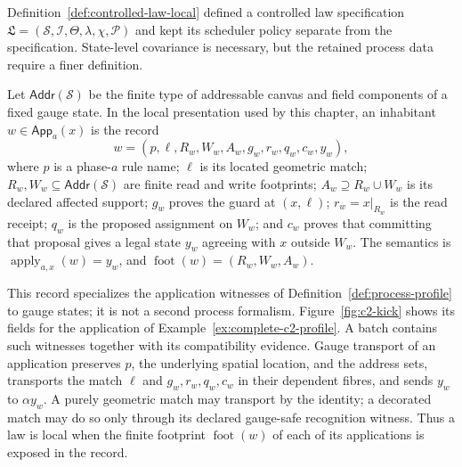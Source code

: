 Definition~\ref{def:controlled-law-local} defined a controlled law specification
$\mathfrak L=(\mathcal S,\mathcal I,\Theta,\lambda,\chi,\mathcal P)$ and kept
its scheduler policy separate from the specification.  State-level covariance
is necessary, but the retained process data require a finer definition.

\begin{definition}
\label{def:located-gauge-application}
Let $\mathsf{Addr}(\mathcal S)$ be the finite type of addressable canvas and
field components of a fixed gauge state.  In the local presentation used by
this chapter, an inhabitant
$w\in\mathsf{App}_a(x)$ is the record
\[
 w=(p,\ell,R_w,W_w,A_w,g_w,r_w,q_w,c_w,y_w),
\]
where $p$ is a phase-$a$ rule name; $\ell$ is its located geometric match;
$R_w,W_w\subseteq\mathsf{Addr}(\mathcal S)$ are finite read and write
footprints; $A_w\supseteq R_w\cup W_w$ is its declared affected support;
$g_w$ proves the guard at $(x,\ell)$; $r_w=x|_{R_w}$ is the read receipt;
$q_w$ is the proposed assignment on $W_w$; and $c_w$ proves that committing
that proposal gives a legal state $y_w$ agreeing with $x$ outside $W_w$.
The semantics is $\operatorname{apply}_{a,x}(w)=y_w$, and
$\operatorname{foot}(w)=(R_w,W_w,A_w)$.
\end{definition}

This record specializes the application witnesses of
Definition~\ref{def:process-profile} to gauge states; it is not a second process formalism.
Figure~\ref{fig:c2-kick} shows its fields for the application of
Example~\ref{ex:complete-c2-profile}.  A batch
contains such witnesses together with its compatibility evidence.  Gauge
transport of an application preserves $p$, the underlying spatial location,
and the address sets, transports the match $\ell$ and
$g_w,r_w,q_w,c_w$ in their dependent fibres, and sends $y_w$ to
$\alpha y_w$.  A purely geometric match may transport by the identity; a
decorated match may do so only through its declared gauge-safe recognition
witness.  Thus a law is local when the finite footprint
$\operatorname{foot}(w)$ of each of its applications is exposed in the record.

